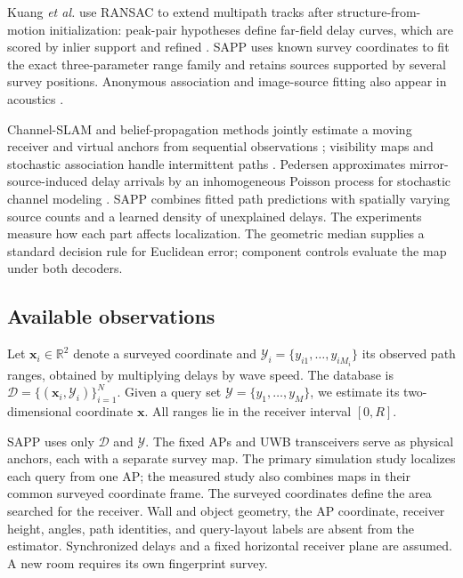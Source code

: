 \documentclass[conference]{IEEEtran}
\newcommand{\D}{\mathcal D}
\newcommand{\Y}{\mathcal Y}
\begin{document}
Kuang \emph{et al.} use RANSAC to extend multipath tracks after structure-from-motion initialization: peak-pair hypotheses define far-field delay curves, which are scored by inlier support and refined \cite{kuang2013anchorfree}. SAPP uses known survey coordinates to fit the exact three-parameter range family and retains sources supported by several survey positions. Anonymous association and image-source fitting also appear in acoustics \cite{dokmanic2013echoes,puomio2021imagesources}.

Channel-SLAM and belief-propagation methods jointly estimate a moving receiver and virtual anchors from sequential observations \cite{gentner2016channelslam,leitinger2019belief,leitinger2023datafusion}; visibility maps and stochastic association handle intermittent paths \cite{ulmschneider2020visibility,karasek2020association}. Pedersen approximates mirror-source-induced delay arrivals by an inhomogeneous Poisson process for stochastic channel modeling \cite{pedersen2019stochastic}. SAPP combines fitted path predictions with spatially varying source counts and a learned density of unexplained delays. The experiments measure how each part affects localization. The geometric median supplies a standard decision rule for Euclidean error; component controls evaluate the map under both decoders.

\subsection{Available observations}
Let \(\bm x_i\in\mathbb R^2\) denote a surveyed coordinate and \(\Y_i=\{y_{i1},\ldots,y_{iM_i}\}\) its observed path ranges, obtained by multiplying delays by wave speed. The database is \(\D=\{(\bm x_i,\Y_i)\}_{i=1}^N\). Given a query set \(\Y=\{y_1,\ldots,y_M\}\), we estimate its two-dimensional coordinate \(\bm x\). All ranges lie in the receiver interval \([0,R]\).

SAPP uses only \(\D\) and \(\Y\). The fixed APs and UWB transceivers serve as physical anchors, each with a separate survey map. The primary simulation study localizes each query from one AP; the measured study also combines maps in their common surveyed coordinate frame. The surveyed coordinates define the area searched for the receiver. Wall and object geometry, the AP coordinate, receiver height, angles, path identities, and query-layout labels are absent from the estimator. Synchronized delays and a fixed horizontal receiver plane are assumed. A new room requires its own fingerprint survey.
\end{document}
